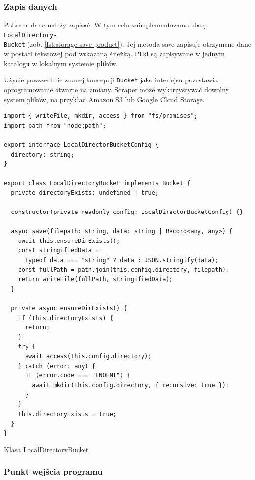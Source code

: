 \subsubsection{Zapis danych}

Pobrane dane należy zapisać.
W tym celu zaimplementowano klasę \texttt{LocalDirectory-\\Bucket} (zob. \autoref{lst:storage-save-product}).
Jej metoda save zapisuje otrzymane dane w postaci tekstowej pod wskazaną ścieżką.
Pliki są zapisywane w jednym katalogu w lokalnym systemie plików.

Użycie powszechnie znanej koncepcji \texttt{Bucket} jako interfejsu pozostawia oprogramowanie otwarte na zmiany.
Scraper może wykorzystywać dowolny system plików, na przykład Amazon S3 lub Google Cloud Storage.

\begin{listing}[p]
    \begin{verbatim}
import { writeFile, mkdir, access } from "fs/promises";
import path from "node:path";

export interface LocalDirectorBucketConfig {
  directory: string;
}

export class LocalDirectoryBucket implements Bucket {
  private directoryExists: undefined | true;

  constructor(private readonly config: LocalDirectorBucketConfig) {}

  async save(filepath: string, data: string | Record<any, any>) {
    await this.ensureDirExists();
    const stringifiedData =
      typeof data === "string" ? data : JSON.stringify(data);
    const fullPath = path.join(this.config.directory, filepath);
    return writeFile(fullPath, stringifiedData);
  }

  private async ensureDirExists() {
    if (this.directoryExists) {
      return;
    }
    try {
      await access(this.config.directory);
    } catch (error: any) {
      if (error.code === "ENOENT") {
        await mkdir(this.config.directory, { recursive: true });
      }
    }
    this.directoryExists = true;
  }
}
    \end{verbatim}
    \caption{Klasa LocalDirectoryBucket}
    \label{lst:storage-save-product}
\end{listing}

\newpage

\subsubsection{Punkt wejścia programu}

